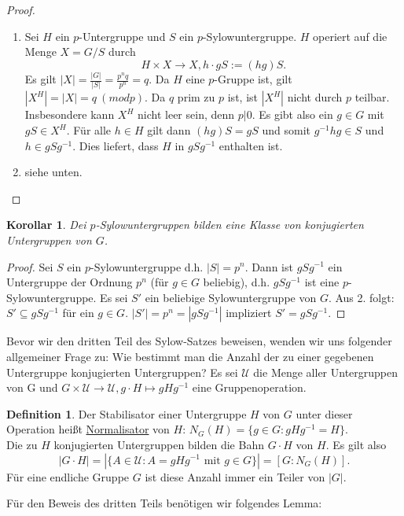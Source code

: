 \documentclass[12pt]{scrartcl}%
\newtheorem{kor}{Korollar}
\theoremstyle{definition}
\newtheorem*{defn}{Definition}
\theoremstyle{remark}
\begin{document}
\begin{proof}
\begin{enumerate}
	\item Sei $H$ ein $p$-Untergruppe und $S$ ein $p$-Sylowuntergruppe. $H$ operiert auf die Menge $X = G/S$ durch
	$$ H \times X \rightarrow X, h \cdot gS := (hg)S.$$
	Es gilt $|X| = \frac{|G|}{|S|} = \frac{p^nq}{p^n} = q$. Da $H$ eine $p$-Gruppe ist, gilt $|X^H| = |X| = q \ (modp)$. Da $q$ prim zu $p$ ist, ist $|X^H|$ nicht durch $p$ teilbar. Insbesondere kann $X^H$ nicht leer sein, denn $p|0$. Es gibt also ein $g \in G$ mit $gS \in X^H$. Für alle $h \in H$ gilt dann $(hg)S = gS$ und somit $g^{-1}hg \in S$ und $h \in gSg^{-1}$. Dies liefert, dass $H$ in $gSg^{-1}$ enthalten ist.
	
	\item siehe unten.
\end{enumerate}
\end{proof}

\begin{kor}
	Dei $p$-Sylowuntergruppen bilden eine Klasse von konjugierten Untergruppen von $G$.
\end{kor}

\begin{proof}
	Sei $S$ ein $p$-Sylowuntergruppe d.h. $|S| = p^n$. Dann ist $gSg^{-1}$ ein Untergruppe der Ordnung $p^n$ (für $g \in G$ beliebig), d.h. $gSg^{-1}$ ist eine $p$-Sylowuntergruppe. Es sei $S'$ ein beliebige Sylowuntergruppe von $G$. Aus 2. folgt: $S' \subseteq gSg^{-1}$ für ein $g \in G$. $|S'| = p^n = |gSg^{-1}|$ impliziert $S' = gSg^{-1}$.
\end{proof}

Bevor wir den dritten Teil des Sylow-Satzes beweisen, wenden wir uns folgender allgemeiner Frage zu: Wie bestimmt man die Anzahl der zu einer gegebenen Untergruppe konjugierten Untergruppen? Es sei $\mathcal{U}$ die Menge aller Untergruppen von G und $ G \times \mathcal{U} \rightarrow \mathcal{U}, g \cdot H \mapsto gHg^{-1} $ eine Gruppenoperation.

\begin{defn}
	Der Stabilisator einer Untergruppe $H$ von $G$ unter dieser Operation heißt \underline{Normalisator} von $H$: $N_G(H) = \{ g \in G: gHg^{-1} = H \}$. \\
	Die zu $H$ konjugierten Untergruppen bilden die Bahn $G \cdot H$ von $H$. Es gilt also
	$$ |G \cdot H| = | \{ A \in \mathcal{U} : A = gHg^{-1} \text{ mit } g \in G \} | = [G:N_G(H)] .$$
	Für eine endliche Gruppe $G$ ist diese Anzahl immer ein Teiler von $|G|$.
\end{defn}

Für den Beweis des dritten Teils benötigen wir folgendes Lemma:
\end{document}
